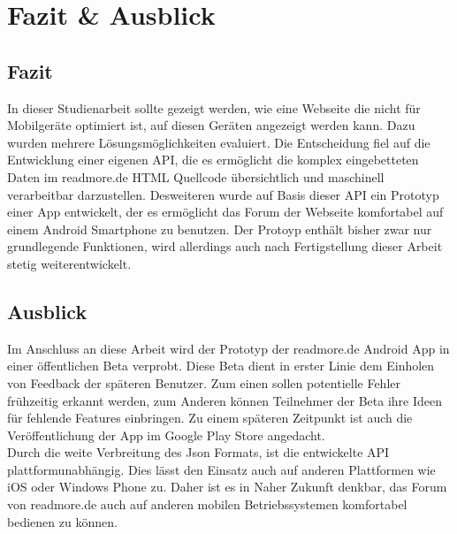 \chapter{Fazit \& Ausblick}
\label{cha:Fazit}
\section{Fazit}
In dieser Studienarbeit sollte gezeigt werden, wie eine Webseite die nicht für
Mobilgeräte optimiert ist, auf diesen Geräten angezeigt werden kann. Dazu wurden
mehrere Lösungsmöglichkeiten evaluiert. Die Entscheidung fiel auf die
Entwicklung einer eigenen API, die es ermöglicht die komplex eingebetteten Daten
im readmore.de HTML Quellcode übersichtlich und maschinell verarbeitbar
darzustellen. Desweiteren wurde auf Basis dieser API ein Prototyp einer App
entwickelt, der es ermöglicht das Forum der Webseite komfortabel auf einem
Android Smartphone zu benutzen. Der Protoyp enthält bisher zwar nur grundlegende
Funktionen, wird allerdings auch nach Fertigstellung dieser Arbeit stetig
weiterentwickelt.
\section{Ausblick}
Im Anschluss an diese Arbeit wird der Prototyp der readmore.de Android App in
einer öffentlichen Beta verprobt. Diese Beta dient in erster Linie dem Einholen
von Feedback der späteren Benutzer. Zum einen sollen potentielle Fehler
frühzeitig erkannt werden, zum Anderen können Teilnehmer der Beta ihre Ideen für
fehlende Features einbringen. Zu einem späteren Zeitpunkt ist auch die
Veröffentlichung der App im Google Play Store angedacht. \\
Durch die weite Verbreitung des Json Formats, ist die entwickelte API
plattformunabhängig. Dies lässt den Einsatz auch auf anderen
Plattformen wie iOS oder Windows Phone zu. Daher ist es in Naher Zukunft
denkbar, das Forum von readmore.de auch auf anderen mobilen Betriebssystemen
komfortabel bedienen zu können.
